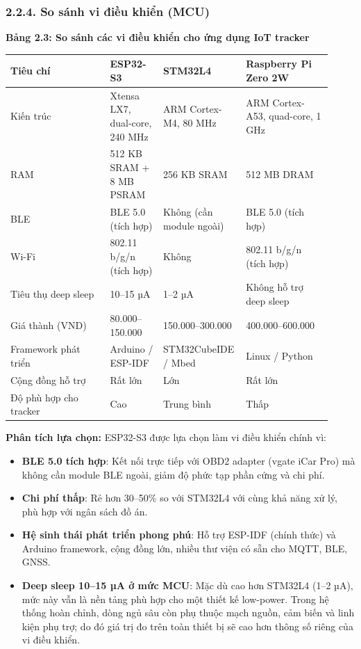 \documentclass[13pt,a4paper]{extarticle}
\newcounter{none} %
\newcommand{\thesislongtableorignewline}{}
\let\thesislongtableorignewline\\
\renewcommand{\\}{\thesislongtableorignewline\hline}%
\let\\\thesislongtableorignewline
\newcommand{\thesistabletitle}[1]{%
  \begin{center}\textbf{#1}\end{center}%
}
\providecommand{\tightlist}{%
  \setlength{\itemsep}{0pt}\setlength{\parskip}{0pt}}
\begin{document}
\subsubsection{2.2.4. So sánh vi điều khiển
(MCU)}\label{224-so-suxe1nh-vi-ux111iux1ec1u-khiux1ec3n-mcu}

\thesistabletitle{Bảng 2.3: So sánh các vi điều khiển cho ứng dụng IoT tracker}

{\def\LTcaptype{none} %
\begin{longtable}{|p{0.30\linewidth}|p{0.16\linewidth}|p{0.20\linewidth}|p{0.26\linewidth}|}
\hline \textbf{Tiêu chí} & \textbf{ESP32-S3} & \textbf{STM32L4} & \textbf{Raspberry Pi Zero 2W} \\
\hline
\endhead
\hline
\endlastfoot
Kiến trúc & Xtensa LX7, dual-core, 240 MHz & ARM Cortex-M4, 80 MHz & ARM
Cortex-A53, quad-core, 1 GHz \\
RAM & 512 KB SRAM + 8 MB PSRAM & 256 KB SRAM & 512 MB DRAM \\
BLE & BLE 5.0 (tích hợp) & Không (cần module ngoài) & BLE 5.0 (tích
hợp) \\
Wi-Fi & 802.11 b/g/n (tích hợp) & Không & 802.11 b/g/n (tích hợp) \\
Tiêu thụ deep sleep & 10--15 µA & 1--2 µA & Không hỗ trợ deep sleep \\
Giá thành (VND) & 80.000--150.000 & 150.000--300.000 &
400.000--600.000 \\
Framework phát triển & Arduino / ESP-IDF & STM32CubeIDE / Mbed & Linux /
Python \\
Cộng đồng hỗ trợ & Rất lớn & Lớn & Rất lớn \\
Độ phù hợp cho tracker & Cao & Trung bình & Thấp \\
\end{longtable}
}

\textbf{Phân tích lựa chọn:} ESP32-S3 được lựa chọn làm vi điều khiển
chính vì:

\begin{itemize}
\tightlist
\item
  \textbf{BLE 5.0 tích hợp}: Kết nối trực tiếp với OBD2 adapter (vgate
  iCar Pro) mà không cần module BLE ngoài, giảm độ phức tạp phần cứng và
  chi phí.
\item
  \textbf{Chi phí thấp}: Rẻ hơn 30--50\% so với STM32L4 với cùng khả
  năng xử lý, phù hợp với ngân sách đồ án.
\item
  \textbf{Hệ sinh thái phát triển phong phú}: Hỗ trợ ESP-IDF (chính
  thức) và Arduino framework, cộng đồng lớn, nhiều thư viện có sẵn cho
  MQTT, BLE, GNSS.
\item
  \textbf{Deep sleep 10--15 µA ở mức MCU}: Mặc dù cao hơn STM32L4 (1--2
  µA), mức này vẫn là nền tảng phù hợp cho một thiết kế low-power. Trong
  hệ thống hoàn chỉnh, dòng ngủ sâu còn phụ thuộc mạch nguồn, cảm biến
  và linh kiện phụ trợ; do đó giá trị đo trên toàn thiết bị sẽ cao hơn
  thông số riêng của vi điều khiển.
\end{itemize}
\end{document}
